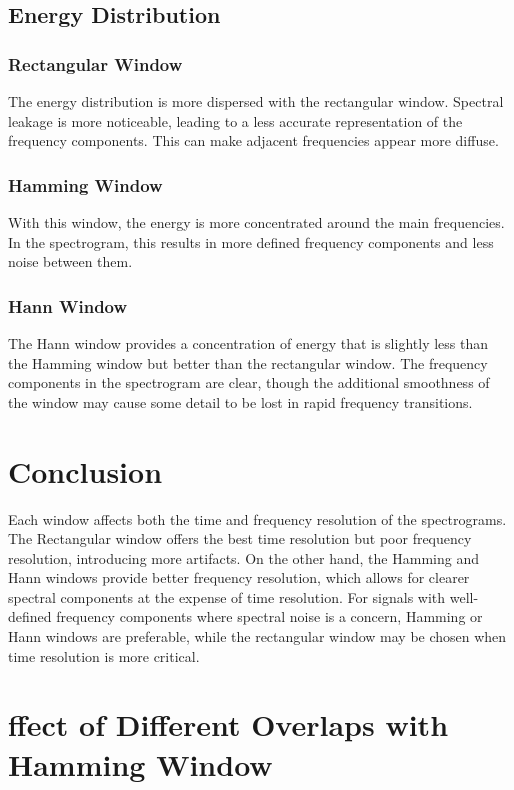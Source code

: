 \documentclass[10pt]{article}
\theoremstyle{definition}
\theoremstyle{remark}
\theoremstyle{definition}
\numberwithin{equation}{prob}
\begin{document}
\subsection{Energy Distribution}

\subsubsection{Rectangular Window}
The energy distribution is more dispersed with the rectangular window. Spectral leakage is more noticeable, leading to a less accurate representation of the frequency components. This can make adjacent frequencies appear more diffuse.

\subsubsection{Hamming Window}
With this window, the energy is more concentrated around the main frequencies. In the spectrogram, this results in more defined frequency components and less noise between them.

\subsubsection{Hann Window}
The Hann window provides a concentration of energy that is slightly less than the Hamming window but better than the rectangular window. The frequency components in the spectrogram are clear, though the additional smoothness of the window may cause some detail to be lost in rapid frequency transitions.


\section*{Conclusion}

Each window affects both the time and frequency resolution of the spectrograms. The Rectangular window offers the best time resolution but poor frequency resolution, introducing more artifacts. On the other hand, the Hamming and Hann windows provide better frequency resolution, which allows for clearer spectral components at the expense of time resolution. For signals with well-defined frequency components where spectral noise is a concern, Hamming or Hann windows are preferable, while the rectangular window may be chosen when time resolution is more critical.



\section{ffect of Different Overlaps with Hamming Window}
\end{document}
